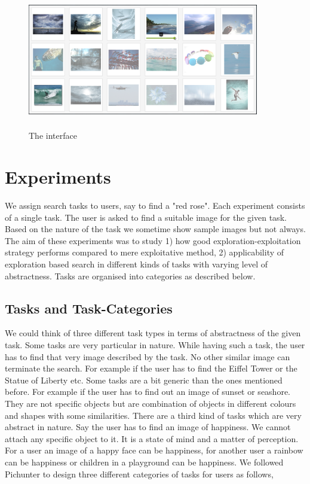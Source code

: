 \documentclass[english]{tktltiki}
\begin{document}
\begin{figure}[h!]
  \centering
    \includegraphics[width=0.90\textwidth,height=6cm]{figures/Seashore_3.png}
    \caption{The interface}
    \label{fig:sample_interface}
\end{figure}

\section{Experiments}

We assign search tasks to users, say to find a "red rose". Each experiment consists of a single task. The user is asked to find a suitable image for the given task. Based on the nature of the task we sometime show sample images but not always. The aim of these experiments was to study 1) how good exploration-exploitation strategy performs compared to mere exploitative method, 2) applicability of exploration based search in different kinds of tasks with varying level of abstractness. Tasks are organised into categories as described below.

\subsection{Tasks and Task-Categories}

 We could think of three different task types in terms of abstractness of the given task. Some tasks are very particular in nature. While having such a task, the user has to find that very image described by the task. No other similar image can terminate the search. For example if the user has to find the Eiffel Tower or the Statue of Liberty etc. Some tasks are a bit generic than the ones mentioned before. For example if the user has to find out an image of sunset or seashore. They are not specific objects but are combination of objects in different colours and shapes with some similarities. There are a third kind of tasks which are very abstract in nature. Say the user has to find an image of happiness. We cannot attach any specific object to it. It is a state of mind and a matter of perception. For a user an image of a happy face can be happiness, for another user a rainbow can be happiness or children in a playground can be happiness. We followed Pichunter \cite{pichunter} to design three different categories of tasks for users as follows,
\end{document}
